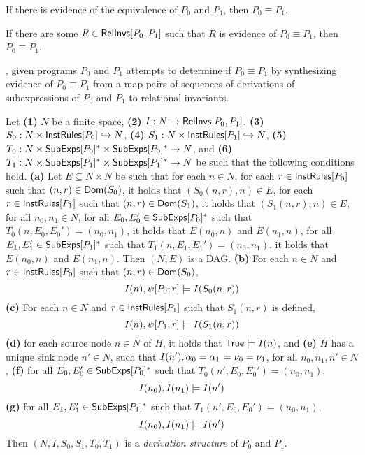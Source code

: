 If there is evidence of the equivalence of $P_0$ and $P_1$, then $P_0
\equiv P_1$.
%
\begin{lemma}
  \label{lemma:equiv-evidence}
  If there are some $R \in \mathsf{RelInvs}[ P_0, P_1 ]$ such that $R$ is
  evidence of $P_0 \equiv P_1$, then $P_0 \equiv P_1$.
\end{lemma}

\sys, given programs $P_0$ and $P_1$ attempts to determine if $P_0
\equiv P_1$ by synthesizing evidence of $P_0 \equiv P_1$ from a map
pairs of sequences of derivations of subexpressions of $P_0$ and $P_1$
to relational invariants.
%
\begin{defn}
  \label{defn:der-structs}
  Let \textbf{(1)} $N$ be a finite space, %
  \textbf{(2)} $I: N \to \mathsf{RelInvs}[ P_0, P_1 ]$,
  \textbf{(3)} $S_0 : N \times \mathsf{InstRules}[ P_0 ] \hookrightarrow N$, %
  \textbf{(4)} $S_1 : N \times \mathsf{InstRules}[ P_1 ] \hookrightarrow N$, %
  \textbf{(5)} $T_0 : N \times \mathsf{SubExps}[ P_0 ]^{*} \times
  \mathsf{SubExps}[ P_0 ]^{*} \to N$, and
  \textbf{(6)} $T_1 : N \times \mathsf{SubExps}[ P_1 ]^{*} \times
  \mathsf{SubExps}[ P_1 ]^{*} \to N$ be such that the following conditions
  hold.
  \textbf{(a)} Let $E \subseteq N \times N$ be such that for each $n
  \in N$, %
  for each $r \in \mathsf{InstRules}[ P_0 ]$ such that $(n, r) \in
  \mathsf{Dom}(S_0)$, it holds that $(S_0(n, r), n) \in E$, %
  for each $r \in \mathsf{InstRules}[ P_1 ]$ such that $(n, r) \in
  \mathsf{Dom}(S_1)$, it holds that $(S_1(n, r), n) \in E$, %
  for all $n_0, n_1 \in N$, %
  for all $E_0, E_0' \in \mathsf{SubExps}[ P_0 ]^{*}$ such that $T_0(n, E_0, E_0')
  = (n_0, n_1)$, it holds that $E(n_0, n)$ and $E(n_1, n)$, %
  for all $E_1, E_1' \in \mathsf{SubExps}[ P_1 ]^{*}$ such that $T_1(n, E_1,
  E_1') = (n_0, n_1)$, it holds that $E(n_0, n)$ and $E(n_1, n)$.
  Then $(N, E)$ is a DAG.
  \textbf{(b)} For each $n \in N$ and $r \in \mathsf{InstRules}[ P_0 ]$ such
  that $(n, r) \in \mathsf{Dom}(S_0)$,
  \[ I(n), \psi[  P_0  ;  r  ] \models I(S_0(n, r))
  \]
  \textbf{(c)} For each $n \in N$ and $r \in \mathsf{InstRules}[ P_1 ]$ such
  that $S_1(n, r)$ is defined,
  \[ I(n), \psi[  P_1  ;  r  ] \models I(S_1(n, r))
  \]
  \textbf{(d)} for each source node $n \in N$ of $H$, it holds that
  $\mathsf{True} \models I(n)$, and
  \textbf{(e)} $H$ has a unique sink node $n' \in N$, such that $I(n'),
  \alpha_0 = \alpha_1 \models \nu_0 = \nu_1$, %
  for all $n_0, n_1, n' \in N$, %
  \textbf{(f)} for all $E_0, E_0' \in \mathsf{SubExps}[ P_0 ]^{*}$ such that
  $T_0(n', E_0, E_0') = (n_0, n_1)$,
  \[ I(n_0), I(n_1) \models I(n') \] %
  \textbf{(g)} for all $E_1, E_1' \in \mathsf{SubExps}[ P_1 ]^{*}$ such that 
  $T_1(n', E_0, E_0') = (n_0, n_1)$, %
  \[ I(n_0), I(n_1) \models I(n') \]
  Then $(N, I, S_0, S_1, T_0, T_1)$ is a \emph{derivation structure}
  of $P_0$ and $P_1$.
\end{defn}
